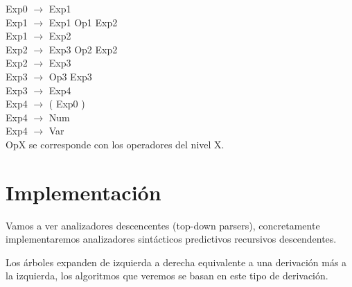 \documentclass[\main/ApuntesPL.tex]{subfiles}
\begin{document}
\begin{center}
\begin{minipage}{.6\textwidth}
          \hspace*{5mm}Exp0 $\rightarrow$ Exp1 \\
          \hspace*{5mm}Exp1 $\rightarrow$ Exp1 Op1 Exp2 \\
          \hspace*{5mm}Exp1 $\rightarrow$ Exp2 \\
          \hspace*{5mm}Exp2 $\rightarrow$ Exp3 Op2 Exp2 \\
          \hspace*{5mm}Exp2 $\rightarrow$ Exp3 \\
          \hspace*{5mm}Exp3 $\rightarrow$ Op3 Exp3 \\
          \hspace*{5mm}Exp3 $\rightarrow$ Exp4 \\
          \hspace*{5mm}Exp4 $\rightarrow$ ( Exp0 ) \\
          \hspace*{5mm}Exp4 $\rightarrow$ Num \\
          \hspace*{5mm}Exp4 $\rightarrow$ Var \\
          OpX se corresponde con los operadores del nivel X.
        \end{minipage}
      \end{center}

  \newpage
  \section{Implementación}
    \par
    Vamos a ver analizadores descencentes (top-down parsers), concretamente implementaremos
    analizadores sintácticos predictivos recursivos descendentes.

    \bigskip
    \par
    Los árboles expanden de izquierda a derecha equivalente a una derivación más a
    la izquierda, los algoritmos que veremos se basan en este tipo de derivación.
\end{document}

